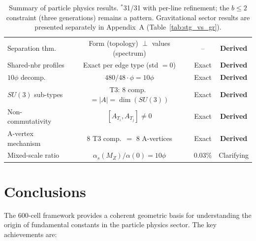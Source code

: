 \documentclass[12pt,a4paper]{article}
\begin{document}
\begin{table}[H]
\begin{tabular}{lccc}
Separation thm. & Form (topology) $\perp$ values (spectrum) & -- & \textbf{Derived} \\
Shared-nbr profiles & Exact per edge type (std $= 0$) & Exact & \textbf{Derived} \\
$10\phi$ decomp. & $480/48 \cdot \phi = 10\phi$ & Exact & \textbf{Derived} \\
$SU(3)$ sub-types & T3: 8 comp.\ $= |A| = \dim(SU(3))$ & Exact & \textbf{Derived} \\
Non-commutativity & $[A_{T_i}, A_{T_j}] \neq 0$ & Exact & \textbf{Derived} \\
A-vertex mechanism & 8 T3 comp.\ $=$ 8 A-vertices & Exact & \textbf{Derived} \\
Mixed-scale ratio & $\alpha_s(M_Z)/\alpha(0) = 10\phi$ & 0.03\% & Clarifying \\
\bottomrule
\end{tabular}
\caption{Summary of particle physics results. $^*$31/31 with per-line refinement; the $b \leq 2$ constraint (three generations) remains a pattern. Gravitational sector results are presented separately in Appendix~A (Table~\ref{tab:stg_vs_gr}).}
\end{table}

\section{Conclusions}
\label{sec:conclusions}

The 600-cell framework provides a coherent geometric basis for understanding the origin of fundamental constants in the particle physics sector. The key achievements are:
\end{document}
